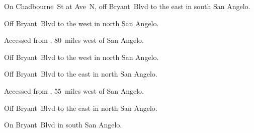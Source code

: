 
\begin{LocationList}

On  Chadbourne~St at Ave~N, off   Bryant~Blvd to the east in south San Angelo.

Off  Bryant~Blvd to the west in north San Angelo.

Accessed from , 80~miles west of San Angelo.

Off  Bryant~Blvd to the west in north San Angelo.

Off  Bryant~Blvd to the east in north San Angelo.

Accessed from , 55~miles west of San Angelo.

Off  Bryant~Blvd to the east in north San Angelo.

\Location{\TruckStop \Gas \Rest}
On   Bryant~Blvd in south San Angelo.

\end{LocationList}
